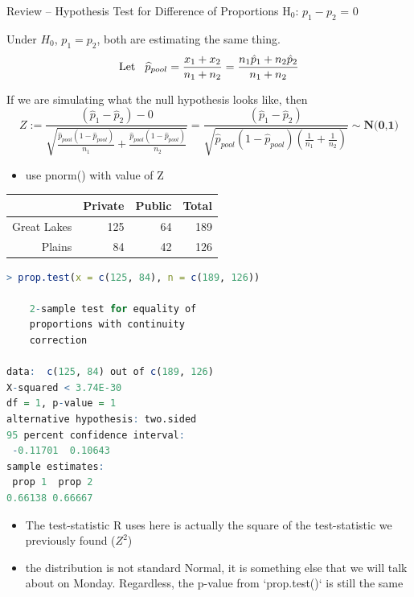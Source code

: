 \documentclass{beamer}
\begin{document}
\begin{frame}{Review -- Hypothesis Test for Difference of Proportions}
H$_0$: $p_1 - p_2$ = 0 \vspace{4mm}

Under $H_0$, $p_1 = p_2$, both are estimating the same thing.
\begin{equation*}
    \text{Let} \hspace{3mm} \widehat{p}_{pool} = \frac{x_1 + x_2}{n_1 + n_2} = \frac{n_1\hat{p}_1 + n_2\hat{p}_2}{n_1 + n_2}
\end{equation*}

If we are simulating what the null hypothesis looks like, then
\begin{equation*}
    Z := \frac{(\hat{p}_1 - \hat{p}_2) - 0}{\sqrt{\frac{\widehat{p}_{pool}(1-\widehat{p}_{pool})}{n_1}+\frac{\widehat{p}_{pool}(1-\widehat{p}_{pool})}{n_2}}} = \frac{(\hat{p}_1 - \hat{p}_2)}{\sqrt{\widehat{p}_{pool}(1-\widehat{p}_{pool})(\frac{1}{n_1}+\frac{1}{n_2})}} \sim \textbf{N(0,1)}
\end{equation*} \vspace{-4mm}
\begin{itemize}
    \item use pnorm() with value of Z
\end{itemize}
\end{frame}


\begin{frame}[fragile]
\footnotesize

\begin{table}[ht]
\centering
\begin{tabular}{rrrr}
  \hline
 & Private & Public & Total \\ 
  \hline
Great Lakes & 125 &  64 & 189 \\ 
  Plains &  84 &  42 & 126 \\ 
   \hline
\end{tabular}
\end{table}


\begin{lstlisting}[language=R]
> prop.test(x = c(125, 84), n = c(189, 126))

	2-sample test for equality of
	proportions with continuity
	correction

data:  c(125, 84) out of c(189, 126)
X-squared < 3.74E-30
df = 1, p-value = 1
alternative hypothesis: two.sided
95 percent confidence interval:
 -0.11701  0.10643
sample estimates:
 prop 1  prop 2 
0.66138 0.66667 
\end{lstlisting}
\begin{itemize}
    \item The test-statistic R uses here is actually the square of the test-statistic we previously found ($Z^2$)
    \item the distribution is not standard Normal, it is something else that we will talk about on Monday. Regardless, the p-value from `prop.test()` is still the same
\end{itemize}
\end{frame}
\end{document}
